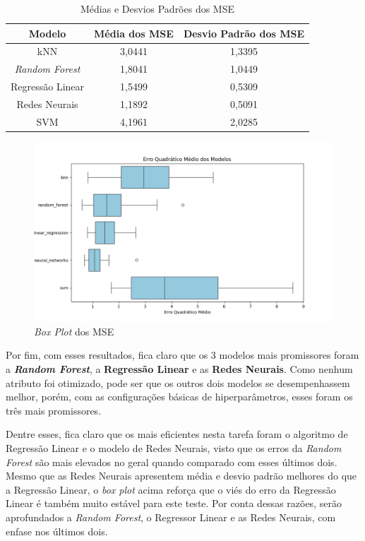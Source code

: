 \documentclass{report}
\begin{document}
\begin{table}[h!]
  \centering
  \begin{tabular}{| c | c | c |}
      \hline
      \rowcolor{lightgray}
      \textbf{Modelo} & \textbf{Média dos MSE} & \textbf{Desvio Padrão dos MSE} \\
      \hline
      kNN & 3,0441 & 1,3395 \\
      \hline
      \textit{Random Forest} & 1,8041 & 1,0449 \\
      \hline
      Regressão Linear & 1,5499 & 0,5309 \\
      \hline
      Redes Neurais & 1,1892 & 0,5091 \\
      \hline
      SVM & 4,1961 & 2,0285 \\
      \hline
  \end{tabular}
  \caption{\label{table:model_summary} Médias e Desvios Padrões dos MSE}
\end{table}

\begin{figure}[h!]
  \centering
  \includegraphics[width=.85\linewidth]{images/plots/box_plots/mse.png}
  \caption{\label{img:mse_boxplot}\textit{Box Plot} dos MSE}
\end{figure}

Por fim, com esses resultados, fica claro que os 3 modelos mais promissores foram
a \textbf{\textit{Random Forest}}, a \textbf{Regressão Linear} e as \textbf{Redes Neurais}. Como nenhum atributo foi otimizado, pode ser que os outros dois modelos se desempenhassem melhor, porém, com
as configurações básicas de hiperparâmetros, esses foram os três mais promissores.

Dentre esses, fica claro que os mais eficientes nesta tarefa foram o algoritmo de Regressão Linear e o modelo de Redes Neurais, visto que os erros da \textit{Random Forest} são mais elevados no geral quando
comparado com esses últimos dois. Mesmo que as Redes Neurais apresentem média e desvio padrão melhores do que a Regressão Linear, o \textit{box plot} acima reforça que o viés do erro da Regressão Linear é também
muito estável para este teste. Por conta dessas razões, serão aprofundados a \textit{Random Forest}, o Regressor Linear e as Redes Neurais, com enfase nos últimos dois.
\end{document}
